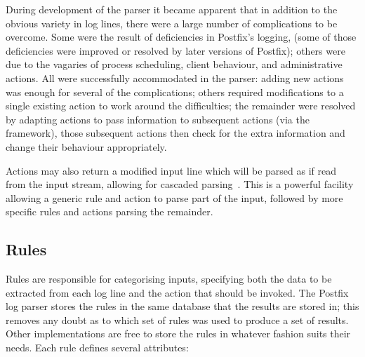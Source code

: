 \documentclass[draft]{svmult}
\begin{document}
\label{complications}

During development of the parser it became apparent that in addition to the
obvious variety in log lines, there were a large number of complications to
be overcome.  Some were the result of deficiencies in Postfix's logging,
(some of those deficiencies were improved or resolved by later versions of
Postfix); others were due to the vagaries of process scheduling, client
behaviour, and administrative actions.  All were successfully accommodated
in the parser: adding new actions was enough for several of the
complications; others required modifications to a single existing action to
work around the difficulties; the remainder were resolved by adapting
actions to pass information to subsequent actions (via the framework),
those subsequent actions then check for the extra information and change
their behaviour appropriately.

Actions may also return a modified input line which will be parsed as if
read from the input stream, allowing for cascaded
parsing~\cite{cascaded-parsing}.  This is a powerful facility allowing a
generic rule and action to parse part of the input, followed by more
specific rules and actions parsing the remainder.

\subsection{Rules}

\label{Rules}

Rules are responsible for categorising inputs, specifying both the data to
be extracted from each log line and the action that should be invoked.  The
Postfix log parser stores the rules in the same \SQL{} database that the
results are stored in; this removes any doubt as to which set of rules was
used to produce a set of results.  Other implementations are free to store
the rules in whatever fashion suits their needs.  Each rule defines several
attributes:
\end{document}

